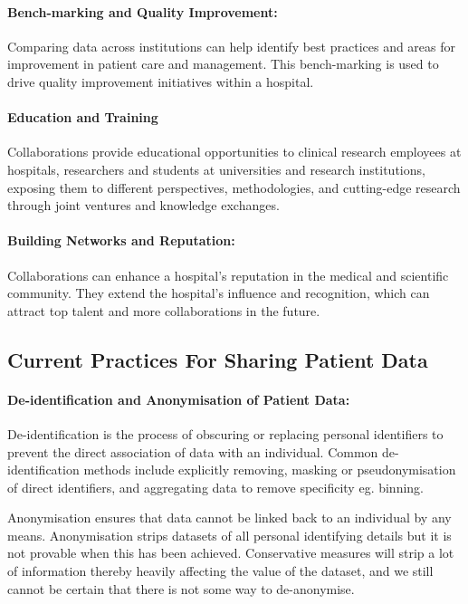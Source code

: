 \documentclass[11pt]{article}
\begin{document}
\paragraph{Bench-marking and Quality Improvement:} Comparing data across institutions can help identify best practices and areas for improvement in patient care and management. This bench-marking is used to drive quality improvement initiatives within a hospital\cite{Werner2005}.

\paragraph{Education and Training} Collaborations provide educational opportunities to clinical research employees at hospitals, researchers and students at universities and research institutions, exposing them to different perspectives, methodologies, and cutting-edge research through joint ventures and knowledge exchanges.

\paragraph{Building Networks and Reputation:} Collaborations can enhance a hospital’s reputation in the medical and scientific community\cite{Vasan2021}. They extend the hospital’s influence and recognition, which can attract top talent and more collaborations in the future.

\subsection{Current Practices For Sharing Patient Data}

\paragraph{De-identification and Anonymisation of Patient Data:}
De-identification is the process of obscuring or replacing personal identifiers to prevent the direct association of data with an individual. Common de-identification methods include explicitly removing,  masking or pseudonymisation of direct identifiers, and  aggregating data to remove specificity eg. binning.  

Anonymisation ensures that data cannot be linked back to an individual by any means. Anonymisation strips datasets of all personal identifying details but it is not provable when this has been achieved. Conservative measures will strip a lot of information thereby heavily affecting the value of the dataset, and we still cannot be certain that there is not some way to de-anonymise. 
\end{document}
